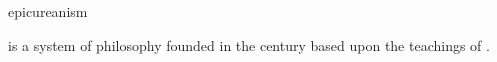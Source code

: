 \documentclass{stex}
\begin{document}
\begin{smodule}{epicureanism}
\begin{sparagraph}[style=symdoc]
 is a system of philosophy founded in the  century
\BCE{} based upon the teachings of .
\end{sparagraph}
\end{smodule}
\end{document}
